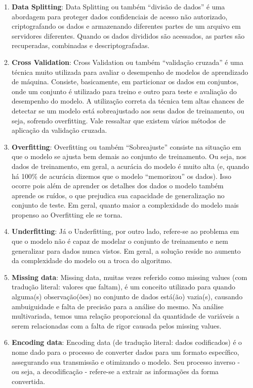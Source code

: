 \documentclass[
]{article}
\begin{document}
\begin{enumerate}
\def\labelenumi{\arabic{enumi}.}
\item
  \textbf{Data Splitting}: Data Splitting ou também ``divisão de dados''
  é uma abordagem para proteger dados confidenciais de acesso não
  autorizado, criptografando os dados e armazenando diferentes partes de
  um arquivo em servidores diferentes. Quando os dados divididos são
  acessados, as partes são recuperadas, combinadas e descriptografadas.
\item
  \textbf{Cross Validation}: Cross Validation ou também ``validação
  cruzada'' é uma técnica muito utilizada para avaliar o desempenho de
  modelos de aprendizado de máquina. Consiste, basicamente, em
  particionar os dados em conjuntos, onde um conjunto é utilizado para
  treino e outro para teste e avaliação do desempenho do modelo. A
  utilização correta da técnica tem altas chances de detectar se um
  modelo está sobreajustado aos seus dados de treinamento, ou seja,
  sofrendo overfitting. Vale ressaltar que existem vários métodos de
  aplicação da validação cruzada.
\item
  \textbf{Overfitting}: Overfitting ou também ``Sobreajuste'' consiste
  na situação em que o modelo se ajusta bem demais ao conjunto de
  treinamento. Ou seja, nos dados de treinamento, em geral, a acurácia
  do modelo é muito alta (e, quando há 100\% de acurácia dizemos que o
  modelo ``memorizou'' os dados). Isso ocorre pois além de aprender os
  detalhes dos dados o modelo também aprende os ruídos, o que prejudica
  sua capacidade de generalização no conjunto de teste. Em geral, quanto
  maior a complexidade do modelo mais propenso ao Overfitting ele se
  torna.
\item
  \textbf{Underfitting}: Já o Underfitting, por outro lado, refere-se ao
  problema em que o modelo não é capaz de modelar o conjunto de
  treinamento e nem generalizar para dados nunca vistos. Em geral, a
  solução reside no aumento da complexidade do modelo ou a troca do
  algoritmo.
\item
  \textbf{Missing data}: Missing data, muitas vezes referido como
  missing values (com tradução literal: valores que faltam), é um
  conceito utilizado para quando alguma(s) observação(ões) no conjunto
  de dados está(ão) vazia(s), causando ambuiguidade e falta de precisão
  para a análise do mesmo. Na análise multivariada, temos uma relação
  proporcional da quantidade de variáveis a serem relacionadas com a
  falta de rigor causada pelos missing values.
\item
  \textbf{Encoding data}: Encoding data (de tradução literal: dados
  codificados) é o nome dado para o processo de converter dados para um
  formato específico, assegurando sua transmissão e otimizando o modelo.
  Seu processo inverso - ou seja, a decodificação - refere-se a extrair
  as informações da forma convertida.
\end{enumerate}
\end{document}
